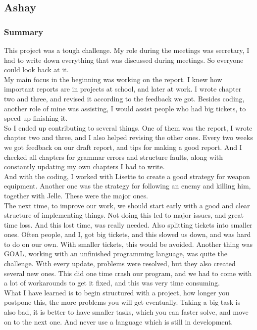 \newpage
\subsection{Ashay}
\subsubsection{Summary} This project was a tough challenge. My role during the meetings was secretary, I had to write down everything that was discussed during meetings. So everyone could look back at it. \\
My main focus in the beginning was working on the report. I knew how important reports are in projects at school, and later at work. I wrote chapter two and three, and revised it according to the feedback we got. Besides coding, another role of mine was assisting, I would assist people who had big tickets, to speed up finishing it. \\
So I ended up contributing to several things. One of them was the report, I wrote chapter two and three, and I also helped revising the other ones. Every two weeks we got feedback on our draft report, and tips for making a good report. And I checked all chapters for grammar errors and structure faults, along with constantly updating my own chapters I had to write. \\
And with the coding, I worked with Lisette to create a good strategy for weapon equipment. Another one was the strategy for following an enemy and killing him, together with Jelle. These were the major ones.\\
The next time, to improve our work, we should start early with a good and clear structure of implementing things. Not doing this led to major issues, and great time loss. And this lost time, was really needed. Also splitting tickets into smaller ones. Often people, and I, got big tickets, and this slowed us down, and was hard to do on our own. With smaller tickets, this would be avoided. Another thing was GOAL, working with an unfinished programming language, was quite the challenge. With every update, problems were resolved, but they also created several new ones. This did one time crash our program, and we had to come with a lot of workarounds to get it fixed, and this was very time consuming.\\
What I have learned is to begin structured with a project, how longer you postpone this, the more problems you will get eventually. Taking a big task is also bad, it is better to have smaller tasks, which you can faster solve, and move on to the next one. And never use a language which is still in development. 

